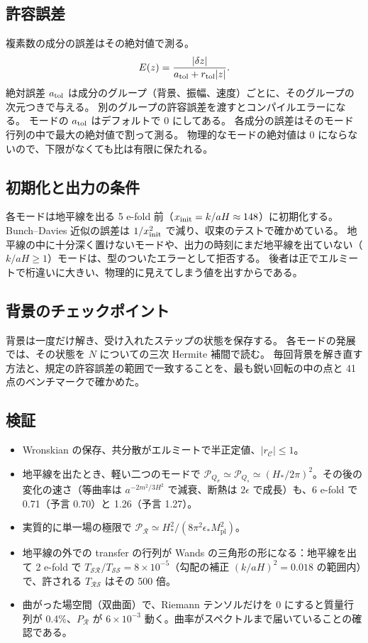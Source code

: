 \documentclass[a4paper,11pt]{ltjsarticle}
\newcommand{\Mpl}{M_{\mathrm{pl}}}
\begin{document}
\subsection{許容誤差}
複素数の成分の誤差はその絶対値で測る。
\[
E(z)=\frac{|\delta z|}{a_{\rm tol}+r_{\rm tol}|z|} .
\]
絶対誤差 $a_{\rm tol}$ は成分のグループ（背景、振幅、速度）ごとに、そのグループの次元つきで与える。
別のグループの許容誤差を渡すとコンパイルエラーになる。
モードの $a_{\rm tol}$ はデフォルトで 0 にしてある。
各成分の誤差はそのモード行列の中で最大の絶対値で割って測る。
物理的なモードの絶対値は 0 にならないので、下限がなくても比は有限に保たれる。

\subsection{初期化と出力の条件}
各モードは地平線を出る 5 e-fold 前（$x_{\rm init}=k/aH\approx148$）に初期化する。
Bunch--Davies 近似の誤差は $1/x_{\rm init}^2$ で減り、収束のテストで確かめている。
地平線の中に十分深く置けないモードや、出力の時刻にまだ地平線を出ていない（$k/aH\geq1$）モードは、型のついたエラーとして拒否する。
後者は正でエルミートで桁違いに大きい、物理的に見えてしまう値を出すからである。

\subsection{背景のチェックポイント}
背景は一度だけ解き、受け入れたステップの状態を保存する。
各モードの発展では、その状態を $N$ についての三次 Hermite 補間で読む。
毎回背景を解き直す方法と、規定の許容誤差の範囲で一致することを、最も鋭い回転の中の点と 41 点のベンチマークで確かめた。

\subsection{検証}
\begin{itemize}
\item Wronskian の保存、共分散がエルミートで半正定値、$|r_{\mathcal C}|\leq1$。
\item 地平線を出たとき、軽い二つのモードで $\mathcal P_{Q_\sigma}\simeq\mathcal P_{Q_s}\simeq(H_*/2\pi)^2$。その後の変化の速さ（等曲率は $a^{-2m^2/3H^2}$ で減衰、断熱は $2\epsilon$ で成長）も、6 e-fold で 0.71（予言 0.70）と 1.26（予言 1.27）。
\item 実質的に単一場の極限で $\mathcal P_{\mathcal R}\simeq H_*^2/(8\pi^2\epsilon_*\Mpl^2)$。
\item 地平線の外での transfer の行列が Wands の三角形の形\cite{Wands2002}になる：地平線を出て 2 e-fold で $T_{\mathcal{SR}}/T_{\mathcal{SS}}=8\times10^{-5}$（勾配の補正 $(k/aH)^2=0.018$ の範囲内）で、許される $T_{\mathcal{RS}}$ はその 500 倍。
\item 曲がった場空間（双曲面）で、Riemann テンソルだけを 0 にすると質量行列が 0.4\%、$P_{\mathcal R}$ が $6\times10^{-3}$ 動く。曲率がスペクトルまで届いていることの確認である。
\end{itemize}
\end{document}
